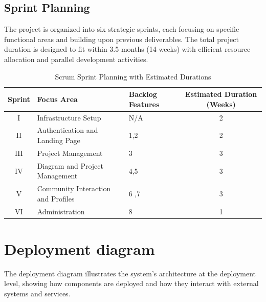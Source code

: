 \subsection{Sprint Planning}

The project is organized into six strategic sprints, each focusing on specific functional areas and building upon previous deliverables. The total project duration is designed to fit within 3.5 months (14 weeks) with efficient resource allocation and parallel development activities.

\begin{table}[h!]
    \centering
    \begin{tabular}{|c|l|l|c|}
        \hline
        \textbf{Sprint} & \textbf{Focus Area}                                & \textbf{Backlog Features}                                   & \textbf{Estimated Duration (Weeks)} \\ \hline
        I              & Infrastructure Setup                               & N/A                                                     & 2                                   \\ \hline
        II             & Authentication and Landing Page                    & 1,2                              & 2                                   \\ \hline
        III            & Project Management                                 & 3                            & 3                                   \\ \hline
        IV             & Diagram and Project Management                     & 4,5                            & 3                                   \\ \hline
        V              & Community Interaction and Profiles                 & 6 ,7                          & 3                                   \\ \hline
        VI             & Administration                                    & 8                            & 1                                   \\ \hline
    \end{tabular}
    \caption{Scrum Sprint Planning with Estimated Durations}
\end{table}

\section{Deployment diagram}

The deployment diagram illustrates the system's architecture at the deployment level, showing how components are deployed and how they interact with external systems and services.

